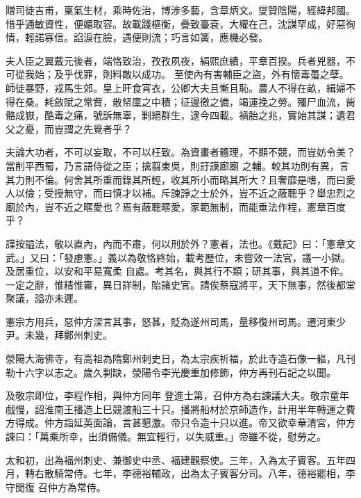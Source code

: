 \begin{pinyinscope}
 贈司徒吉甫，稟氣生材，乘時佐治，博涉多藝，含章炳文。燮贊陰陽，經緯邦國。惜乎通敏資性，便媚取容。故載踐樞衡，疊致臺袞，大權在己，沈謀罕成，好惡徇情，輕諾寡信。諂淚在臉，遇便則流；巧言如簧，應機必發。



 夫人臣之翼戴元後者，端恪致治，孜孜夙夜，絹熙庶績，平章百揆。兵者兇器，不可從我始；及乎伐罪，則料敵以成功。
 至使內有害輔臣之盜，外有懷毒蠆之孽。師徒暴野，戎馬生郊。皇上旰食宵衣，公卿大夫且慚且恥。農人不得在畝，緝婦不得在桑。耗斂賦之常貲，散帑廩之中積；征邊徼之備，竭運挽之勞。殭尸血流，胔骼成嶽，酷毒之痛，號訴無辜，剿絕群生，逮今四載。禍胎之兆，實始其謀；遺君父之憂，而豈謂之先覺者乎？



 夫論大功者，不可以妄取，不可以枉致。為資畫者體理，不顯不競，而豈妨令美？當削平西蜀，乃言語侍從之臣；擒翦東吳，則訏謨廊廟
 之輔。較其功則有異，言其力則不倫。何舍其所重而錄其所輕，收其所小而略其所大？且奢靡是嗜，而曰愛人以儉；受授無守，而曰慎才以補。斥諫諍之士於外，豈不近之蔽聰乎？舉忠烈之廟於內，豈不近之暱愛也？焉有蔽聰暱愛，家範無制，而能垂法作程，憲章百度乎？



 謹按謚法，敬以直內，內而不肅，何以刑於外？憲者，法也。《戴記》曰：「憲章文武。」又曰：「發慮憲。」義以為敬恪終始，載考歷位，未嘗效一法官，議一小獄。及居重位，以安和平易寬柔
 自處。考其名，與其行不類；研其事，與其道不侔。一定之辭，惟精惟審，異日詳制，貽諸史官。請俟蔡寇將平，天下無事，然後都堂聚議，謚亦未遲。



 憲宗方用兵，惡仲方深言其事，怒甚，貶為遂州司馬，量移復州司馬。遷河東少尹。未幾，拜鄭州刺史。



 滎陽大海佛寺，有高祖為隋鄭州刺史日，為太宗疾祈福，於此寺造石像一軀，凡刊勒十六字以志之。歲久剚缺，滎陽令李光慶重加修飾，仲方再刊石記之以聞。



 及敬宗即位，李程作相，與仲方同年
 登進士第，召仲方為右諫議大夫。敬宗童年戲慢，詔淮南王播造上巳競渡船三十只。播將船材於京師造作，計用半年轉運之費方得成。仲方詣延英面論，言甚懇激。帝只令造十只以進。帝又欲幸華清宮，仲方諫曰：「萬乘所幸，出須備儀。無宜輕行，以失威重。」帝雖不從，慰勞之。



 太和初，出為福州刺史、兼御史中丞、福建觀察使。三年，入為太子賓客。五年四月，轉右散騎常侍。七年，李德裕輔政，出為太子賓客分司。八年，德裕罷相，李守閔復
 召仲方為常侍。




\end{pinyinscope}

